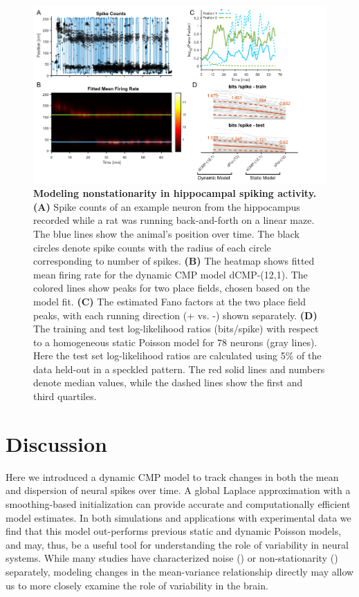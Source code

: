 \documentclass[aoas]{imsart}
\theoremstyle{plain}
\theoremstyle{remark}
\begin{document}
\begin{figure}[h!]
	\centering
	\includegraphics[width=1\textwidth]{figure5.png}
	\caption{\textbf{Modeling nonstationarity in hippocampal spiking activity. (A)} Spike counts of an example neuron from the hippocampus recorded while a rat was running back-and-forth on a linear maze. The blue lines show the animal’s position over time. The black circles denote spike counts with the radius of each circle corresponding to number of spikes. \textbf{(B)} The heatmap shows fitted mean firing rate for the dynamic CMP model dCMP-(12,1). The colored lines show peaks for two place fields, chosen based on the model fit. \textbf{(C)} The estimated Fano factors at the two place field peaks, with each running direction (+ vs. -) shown separately. \textbf{(D)} The training and test log-likelihood ratios (bits/spike) with respect to a homogeneous static Poisson model for 78 neurons (gray lines). Here the test set log-likelihood ratios are calculated using 5\% of the data held-out in a speckled pattern. The red solid lines and numbers denote median values, while the dashed lines show the first and third quartiles.}
	\label{fig5}
\end{figure}

\section{Discussion}
Here we introduced a dynamic CMP model to track changes in both the mean and dispersion of neural spikes over time. A global Laplace approximation with a smoothing-based initialization can provide accurate and computationally efficient model estimates. In both simulations and applications with experimental data we find that this model out-performs previous static and dynamic Poisson models, and may, thus, be a useful tool for understanding the role of variability in neural systems. While many studies have characterized noise (\cite{DeWeese2003,Deweese2004,Taouali2016}) or non-stationarity (\cite{Tomko1974,Wu2008}) separately, modeling changes in the mean-variance relationship directly may allow us to more closely examine the role of variability in the brain. 
\end{document}
